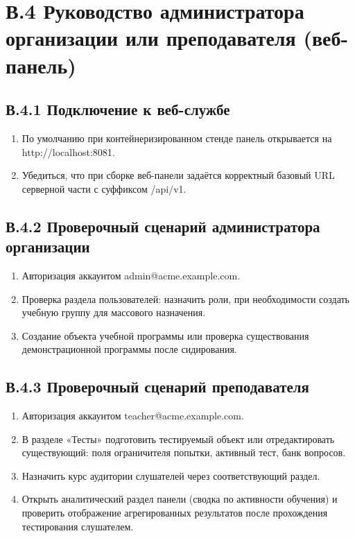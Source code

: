 \section*{В.4 Руководство администратора организации или преподавателя (веб-панель)}

\subsection*{В.4.1 Подключение к веб-службе}

\begin{enumerate}
  \item По умолчанию при контейнеризированном стенде панель открывается на http://localhost:8081.
  \item Убедиться, что при сборке веб-панели задаётся корректный базовый URL серверной части с суффиксом /api/v1.
\end{enumerate}

\subsection*{В.4.2 Проверочный сценарий администратора организации}

\begin{enumerate}
  \item Авторизация аккаунтом admin@acme.example.com.
  \item Проверка раздела пользователей: назначить роли, при необходимости создать учебную группу для массового назначения.
  \item Создание объекта учебной программы или проверка существования демонстрационной программы после сидирования.
\end{enumerate}

\subsection*{В.4.3 Проверочный сценарий преподавателя}

\begin{enumerate}
  \item Авторизация аккаунтом teacher@acme.example.com.
  \item В разделе «Тесты» подготовить тестируемый объект или отредактировать существующий: поля ограничителя попытки, активный тест, банк вопросов.
  \item Назначить курс аудитории слушателей через соответствующий раздел.
  \item Открыть аналитический раздел панели (сводка по активности обучения) и проверить отображение агрегированных результатов после прохождения тестирования слушателем.
\end{enumerate}


